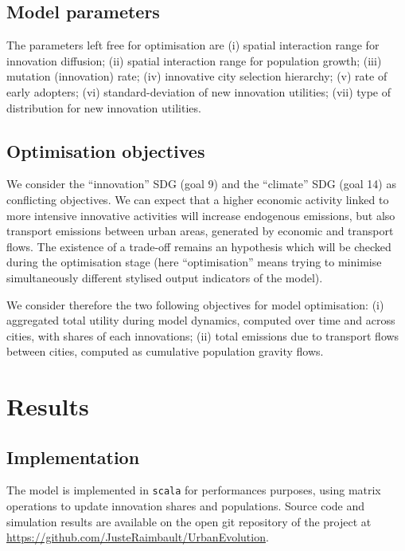 \documentclass{article}
\begin{document}
\subsection{Model parameters}

The parameters left free for optimisation are (i) spatial interaction range for innovation diffusion; (ii) spatial interaction range for population growth; (iii) mutation (innovation) rate; (iv) innovative city selection hierarchy; (v) rate of early adopters; (vi) standard-deviation of new innovation utilities; (vii) type of distribution for new innovation utilities.



\subsection{Optimisation objectives}

We consider the ``innovation'' SDG (goal 9) and the ``climate'' SDG (goal 14) as conflicting objectives. We can expect that a higher economic activity linked to more intensive innovative activities will increase endogenous emissions, but also transport emissions between urban areas, generated by economic and transport flows. The existence of a trade-off remains an hypothesis which will be checked during the optimisation stage (here ``optimisation'' means trying to minimise simultaneously different stylised output indicators of the model).

We consider therefore the two following objectives for model optimisation: (i) aggregated total utility during model dynamics, computed over time and across cities, with shares of each innovations; (ii) total emissions due to transport flows between cities, computed as cumulative population gravity flows.


\section{Results}

\subsection{Implementation}

The model is implemented in \texttt{scala} for performances purposes, using matrix operations to update innovation shares and populations. Source code and simulation results are available on the open git repository of the project at \url{https://github.com/JusteRaimbault/UrbanEvolution}.
\end{document}
